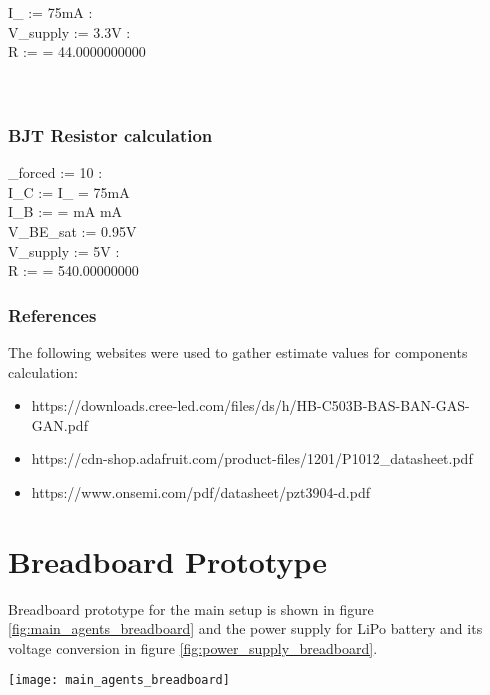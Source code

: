 \documentclass[a4paper]{article}
\begin{document}
I_{\max} := 75mA : \\
V_{supply} := 3.3V : \\
R :=  = 44.0000000000 \Omega \\
\\
\\

\subsubsection{BJT Resistor calculation}

\beta_{forced} := 10 : \\
I_C := I_{\max} = 75mA \\
I_B :=  =  mA   mA \\
V_{BE\_sat} := 0.95V \\
V_{supply} := 5V : \\
R :=  = 540.00000000 \Omega \\


\subsubsection{References}

\noindent The following websites were used to gather estimate values for components calculation:
\begin{itemize}
\item https://downloads.cree-led.com/files/ds/h/HB-C503B-BAS-BAN-GAS-GAN.pdf
\item https://cdn-shop.adafruit.com/product-files/1201/P1012\_datasheet.pdf
\item https://www.onsemi.com/pdf/datasheet/pzt3904-d.pdf
\end{itemize}


\section{Breadboard Prototype}

\noindent Breadboard prototype for the main setup is shown in figure \ref{fig:main_agents_breadboard} and the power supply for LiPo battery and its voltage conversion in figure \ref{fig:power_supply_breadboard}.

\begin{figure*}[!htb]
  \centering
  \texttt{[image: main\_agents\_breadboard]}
  \caption[Breadboard with main and two agents.]{Breadboard setup of the ESP32 C3 mini main controller and two ATmega agents controlling the motors and LEDs modules.}
  \label{fig:main_agents_breadboard}
\end{figure*}
\end{document}
